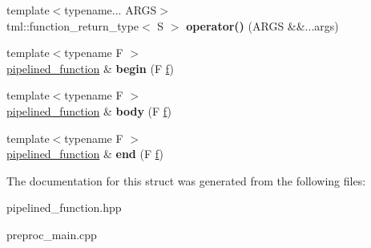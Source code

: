 \begin{DoxyCompactItemize}
\item 
\hypertarget{structtml_1_1runtime_1_1pipelined__function_ae05535c5a51440c137e5120ffcd9346c}{{\footnotesize template$<$typename... A\+R\+G\+S$>$ }\\tml\+::function\+\_\+return\+\_\+type$<$ S $>$ {\bfseries operator()} (A\+R\+G\+S \&\&...args)}\label{structtml_1_1runtime_1_1pipelined__function_ae05535c5a51440c137e5120ffcd9346c}

\item 
\hypertarget{structtml_1_1runtime_1_1pipelined__function_af4fa0e88f89a1fa3800361cc5cde2712}{{\footnotesize template$<$typename F $>$ }\\\hyperlink{structtml_1_1runtime_1_1pipelined__function}{pipelined\+\_\+function} \& {\bfseries begin} (F \hyperlink{structf}{f})}\label{structtml_1_1runtime_1_1pipelined__function_af4fa0e88f89a1fa3800361cc5cde2712}

\item 
\hypertarget{structtml_1_1runtime_1_1pipelined__function_a1af710ab666b5a8e45dad01664ca38ba}{{\footnotesize template$<$typename F $>$ }\\\hyperlink{structtml_1_1runtime_1_1pipelined__function}{pipelined\+\_\+function} \& {\bfseries body} (F \hyperlink{structf}{f})}\label{structtml_1_1runtime_1_1pipelined__function_a1af710ab666b5a8e45dad01664ca38ba}

\item 
\hypertarget{structtml_1_1runtime_1_1pipelined__function_aa56ca403b77b349831e5b33d66765e91}{{\footnotesize template$<$typename F $>$ }\\\hyperlink{structtml_1_1runtime_1_1pipelined__function}{pipelined\+\_\+function} \& {\bfseries end} (F \hyperlink{structf}{f})}\label{structtml_1_1runtime_1_1pipelined__function_aa56ca403b77b349831e5b33d66765e91}

\end{DoxyCompactItemize}


The documentation for this struct was generated from the following files\+:\begin{DoxyCompactItemize}
\item 
pipelined\+\_\+function.\+hpp\item 
preproc\+\_\+main.\+cpp\end{DoxyCompactItemize}
